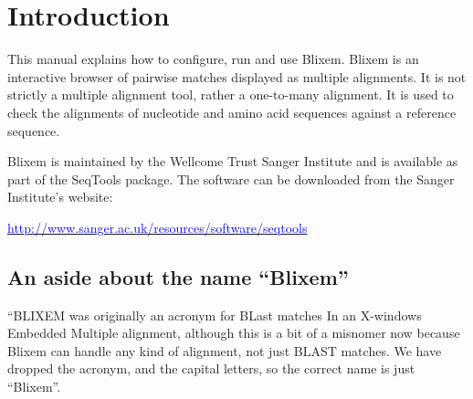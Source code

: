 \documentclass[letterpaper]{article}
\newcommand\textstyleInternetlink[1]{\textcolor{blue}{#1}}
\begin{document}
\bigskip

\setcounter{tocdepth}{10}
\renewcommand\contentsname{Contents}

\clearpage\tableofcontents

\clearpage
{\color[rgb]{0.0,0.27058825,0.5254902}\section[Introduction]{Introduction}}
\hypertarget{RefHeading1421056909880}{}{
{This manual explains how to configure, run and
use Blixem. }{Blixem is an interactive
browser of pairwise matches displayed as multiple alignments. It is not
strictly a multiple alignment tool, rather a
{\textquotesingle}one-to-many{\textquotesingle} alignment. It is used
to check the alignments of nucleotide and amino acid sequences against
a reference sequence.}}


\bigskip

Blixem is maintained by the Wellcome Trust
Sanger Institute and is available as part of the SeqTools package.
The software can be downloaded from the Sanger
Institute{\textquoteright}s website:

\href{http://www.sanger.ac.uk/resources/software/seqtools/}
{\textstyleInternetlink{http://www.sanger.ac.uk/resources/software/seqtools}}

{\color[rgb]{0.30980393,0.5058824,0.7411765}\subsection[An aside about the name
{\textquotedblleft}Blixem{\textquotedblright}]{An aside about the name {\textquotedblleft}Blixem{\textquotedblright}}}
\hypertarget{RefHeading1441056909880}{}{
{{\textquotedblleft}BLIXEM{\textquotedbl} was
originally an acronym for
}{{\textquotedbl}BLast matches In an X-windows
Embedded Multiple alignment{\textquotedbl}, although this is a bit of a
misnomer now because Blixem can handle any kind of alignment, not just
BLAST matches. We have dropped the acronym, and the capital letters,
so the correct name is just
{\textquotedblleft}Blixem{\textquotedblright}.}}
\end{document}
